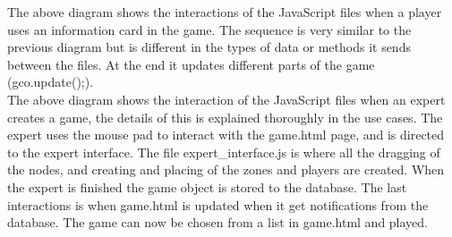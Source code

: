 
The above diagram shows the interactions of the JavaScript files when a player uses an information card in the game. The sequence is very similar to the previous diagram but is different in the types of data or methods it sends between the files. At the end it updates different parts of the game (gco.update();).\\



The above diagram shows the interaction of the JavaScript files when an expert creates a game, the details of this is explained thoroughly in the use cases. The expert uses the mouse pad to interact with the game.html page, and is directed to the expert interface. The file expert_interface.js is where all the dragging of the nodes, and creating and placing of the zones and players are created. When the expert is finished the game object is stored to the database. The last interactions is when game.html is updated when it get notifications from the database. The game can now be chosen from a list in game.html and played. \\

